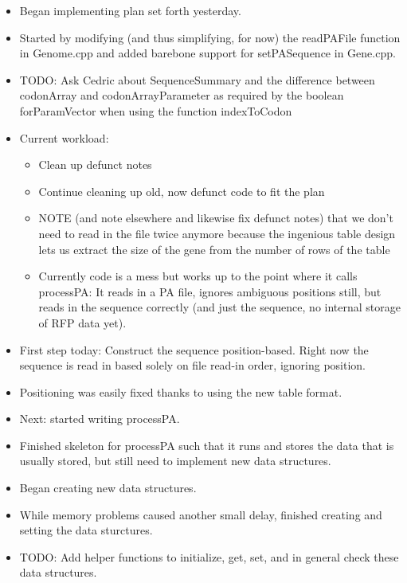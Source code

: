 \documentclass[12pt,hyperref]{labbook}
\begin{document}
\begin{itemize}
    \item Began implementing plan set forth yesterday.
    \item Started by modifying (and thus simplifying, for now) the readPAFile function in Genome.cpp and added barebone support for setPASequence in Gene.cpp.
    \item TODO: Ask Cedric about SequenceSummary and the difference between codonArray and codonArrayParameter as required by the boolean forParamVector when using the function indexToCodon
    \item Current workload:
    \begin{itemize}
        \item Clean up defunct notes
        \item Continue cleaning up old, now defunct code to fit the plan
        \item NOTE (and note elsewhere and likewise fix defunct notes) that we don't need to read in the file twice anymore because the ingenious table design lets us extract the size of the gene from the number of rows of the table
        \item Currently code is a mess but works up to the point where it calls processPA: It reads in a PA file, ignores ambiguous positions still, but reads in the sequence correctly (and just the sequence, no internal storage of RFP data yet).
    \end{itemize}
\end{itemize}


\begin{itemize}
    \item First step today: Construct the sequence position-based.
    Right now the sequence is read in based solely on file read-in order, ignoring position.
    \item Positioning was easily fixed thanks to using the new table format.
    \item Next: started writing processPA.
    \item Finished skeleton for processPA such that it runs and stores the data that is usually stored, but still need to implement new data structures.
\end{itemize}


\begin{itemize}
    \item Began creating new data structures.
    \item While memory problems caused another small delay, finished creating and setting the data sturctures.
    \item TODO: Add helper functions to initialize, get, set, and in general check these data structures.
\end{itemize}
\end{document}
